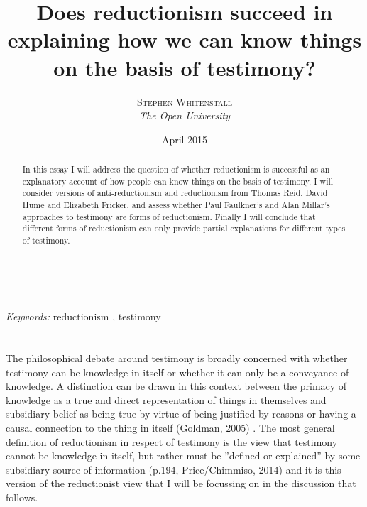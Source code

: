 \documentclass[a4paper, 11pt]{article} %
\title{\textbf{Does reductionism succeed in explaining how we can know things on the basis of testimony?}\\ %
}
\author{\textsc{Stephen Whitenstall} %
\\{\textit{The Open University}}} %
\date{April 2015}
\makeatletter
\renewcommand{\maketitle}{ %
\begin{flushright} %
{\LARGE\@title} %

\vspace{50pt} %

{\large\@author} %
\\\@date %

\vspace{40pt} %
\end{flushright}
}
\makeatother
\begin{document}
\maketitle %



\begin{abstract}
In this essay I will address the question of whether reductionism is successful as an explanatory account of how people can know things on the basis of testimony. I will consider versions of anti-reductionism and reductionism from Thomas Reid, David Hume and Elizabeth Fricker, and assess whether Paul Faulkner's and Alan Millar's approaches to testimony are forms of reductionism. Finally I will conclude that different forms of reductionism can only provide partial explanations for different types of testimony.
\end{abstract}

\hspace*{3,6mm}\textit{Keywords:} reductionism , testimony %

\vspace{30pt} %


\section*{}

The philosophical debate around testimony is broadly concerned with whether testimony can be knowledge in itself or whether it can only be a conveyance of knowledge. A distinction can be drawn in this context between the primacy of knowledge as a true and direct representation of things in themselves and subsidiary belief as being true by virtue of being justified by reasons or having a causal connection to the thing in itself (Goldman, 2005) \cite{Goldman:2005}. The most general definition of reductionism in respect of testimony is the view that testimony cannot be knowledge in itself, but rather must be ''defined or explained'' by some subsidiary source of information (p.194, Price/Chimmiso, 2014) \cite{Price/Chismisso:2014} and it is this version of the reductionist view that I will be focussing on in the discussion that follows.
\end{document}

